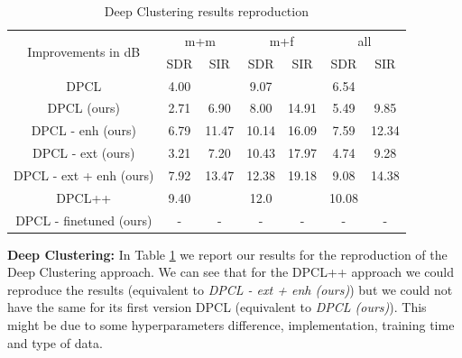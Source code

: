 \documentclass[master, tikz, final,11pt, dvipdfmx]{iscs-thesis}
\begin{document}
\begin{table}[ht]
\centering
\begin{tabular}{c|c|c|c|c|c|c}
\multirow{2}{*}{Improvements in dB} & \multicolumn{2}{c|}{m+m} & \multicolumn{2}{c|}{m+f} & \multicolumn{2}{c}{all} \\ 
\cline{2-7} 
 & SDR & SIR & SDR & SIR & SDR & SIR \\ 
\hline 
DPCL \cite{DPCLV1} & 4.00 &  & 9.07 &  & 6.54 &  \\ 
DPCL (ours) & 2.71 & 6.90 & 8.00 & 14.91 & 5.49 & 9.85 
\\ 
\hline 
\hline 
DPCL - enh (ours) & 6.79 & 11.47 & 10.14 & 16.09 & 7.59 & 12.34 \\ 
DPCL - ext (ours) & 3.21 & 7.20 & 10.43 & 17.97 & 4.74 & 9.28 \\ 
DPCL - ext + enh (ours) & 7.92 & 13.47 & 12.38 & 19.18 & 9.08 & 14.38 \\ 
\hline 
\hline 
DPCL++ \cite{DPCLV2} & 9.40 &  & 12.0 &  & 10.08 &  \\ 
DPCL - finetuned (ours) & - & - & - & - & - & - \\ 
\end{tabular}
\captionsetup{justification=centering}
\caption{Deep Clustering results reproduction}
\label{table:DPCLreprod}
\end{table}

\textbf{Deep Clustering:} In Table \ref{table:DPCLreprod} we report our results for the reproduction of the Deep Clustering approach. We can see that for the DPCL++ \cite{DPCLV2} approach we could reproduce the results (equivalent to \textit{DPCL - ext + enh (ours)}) but we could not have the same for its first version DPCL \cite{DPCLV1} (equivalent to \textit{DPCL (ours)}). This might be due to some hyperparameters difference, implementation, training time and type of data.
\end{document}

